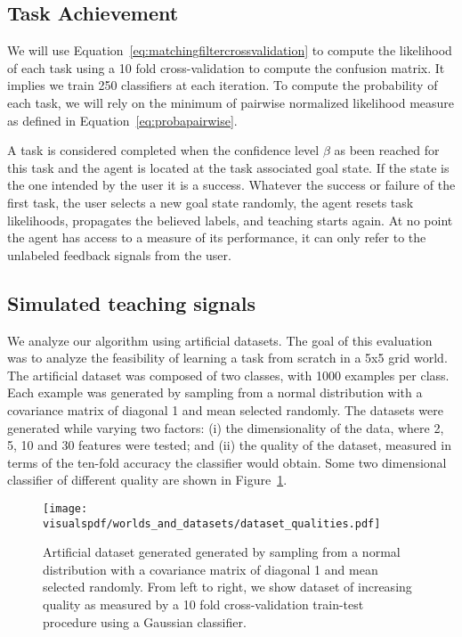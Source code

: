 \subsection{Task Achievement}

We will use Equation~\ref{eq:matchingfiltercrossvalidation} to compute the likelihood of each task using a 10 fold cross-validation to compute the confusion matrix. It implies we train 250 classifiers at each iteration. To compute the probability of each task, we will rely on the minimum of pairwise normalized likelihood measure as defined in Equation~\ref{eq:probapairwise}.

A task is considered completed when the confidence level $\beta$ as been reached for this task and the agent is located at the task associated goal state. If the state is the one intended by the user it is a success. Whatever the success or failure of the first task, the user selects a new goal state randomly, the agent resets task likelihoods, propagates the believed labels, and teaching starts again. At no point the agent has access to a measure of its performance, it can only refer to the unlabeled feedback signals from the user.

\subsection{Simulated teaching signals}
\label{chapter:planning:artificialsignals}

We analyze our algorithm using artificial datasets. The goal of this evaluation was to analyze the feasibility of learning a task from scratch in a 5x5 grid world. The artificial dataset was composed of two classes, with 1000 examples per class. Each example was generated by sampling from a normal distribution with a covariance matrix of diagonal 1 and mean selected randomly. The datasets were generated while varying two factors: (i) the dimensionality of the data, where 2, 5, 10 and 30 features were tested; and (ii) the quality of the dataset, measured in terms of the ten-fold accuracy the classifier would obtain. Some two dimensional classifier of different quality are shown in Figure~\ref{fig:datasetsquality}.

\begin{figure}[!htbp]
  \centering
      \texttt{[image: \\visualspdf/worlds\_and\_datasets/dataset\_qualities.pdf]}
      \caption{Artificial dataset generated generated by sampling from a normal distribution with a covariance matrix of diagonal 1 and mean selected randomly. From left to right, we show dataset of increasing quality as measured by a 10 fold cross-validation train-test procedure using a Gaussian classifier.}
    \label{fig:datasetsquality}
\end{figure}


